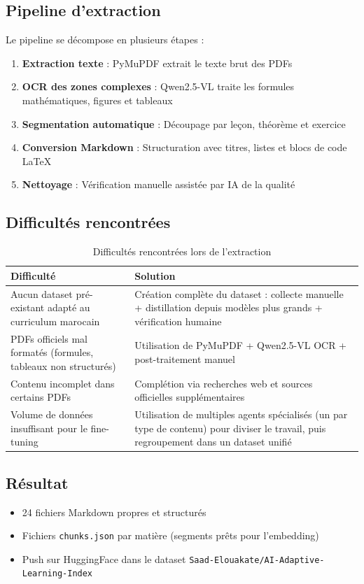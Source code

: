 \documentclass[12pt,a4paper]{report}
\begin{document}
\subsection{Pipeline d'extraction}
Le pipeline se décompose en plusieurs étapes :

\begin{enumerate}
    \item \textbf{Extraction texte} : PyMuPDF extrait le texte brut des PDFs
    \item \textbf{OCR des zones complexes} : Qwen2.5-VL traite les formules mathématiques, figures et tableaux
    \item \textbf{Segmentation automatique} : Découpage par leçon, théorème et exercice
    \item \textbf{Conversion Markdown} : Structuration avec titres, listes et blocs de code LaTeX
    \item \textbf{Nettoyage} : Vérification manuelle assistée par IA de la qualité
\end{enumerate}

\subsection{Difficultés rencontrées}
\begin{table}[h!]
    \centering
    \begin{tabular}{p{6cm} p{8cm}}
        \toprule
        \textbf{Difficulté} & \textbf{Solution} \\
        \midrule
        Aucun dataset pré-existant adapté au curriculum marocain & Création complète du dataset : collecte manuelle + distillation depuis modèles plus grands + vérification humaine \\
        PDFs officiels mal formatés (formules, tableaux non structurés) & Utilisation de PyMuPDF + Qwen2.5-VL OCR + post-traitement manuel \\
        Contenu incomplet dans certains PDFs & Complétion via recherches web et sources officielles supplémentaires \\
        Volume de données insuffisant pour le fine-tuning & Utilisation de multiples agents spécialisés (un par type de contenu) pour diviser le travail, puis regroupement dans un dataset unifié \\
        \bottomrule
    \end{tabular}
    \caption{Difficultés rencontrées lors de l'extraction}
\end{table}

\subsection{Résultat}
\begin{itemize}
    \item 24 fichiers Markdown propres et structurés
    \item Fichiers \texttt{chunks.json} par matière (segments prêts pour l'embedding)
    \item Push sur HuggingFace dans le dataset \texttt{Saad-Elouakate/AI-Adaptive-Learning-Index}
\end{itemize}
\end{document}
